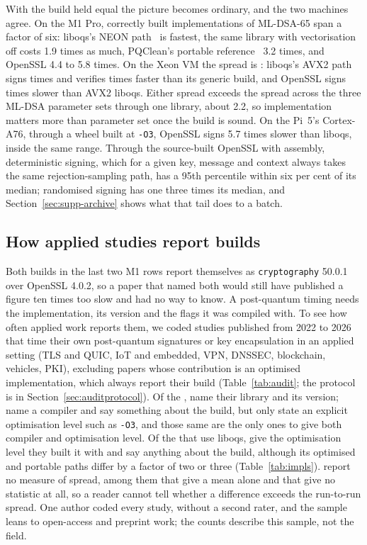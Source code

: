 With the build held equal the picture becomes ordinary, and the two machines
agree. On the M1 Pro, correctly built implementations of ML-DSA-65 span a
factor of six: liboqs's NEON path~\cite{becker2022neon} is fastest, the same
library with vectorisation off costs 1.9 times as much, PQClean's portable
reference~\cite{kannwischer2022pqclean} 3.2 times, and OpenSSL 4.4 to 5.8
times. On the Xeon VM the spread is \NxSpread: liboqs's AVX2 path signs
\NavxSign{} times and verifies \NavxVerify{} times faster than its generic
build, and OpenSSL signs \NxOsslVsOqs{} times slower than AVX2 liboqs. Either
spread exceeds the spread across the three ML-DSA parameter sets through one
library, about 2.2, so implementation matters more than parameter set once the
build is sound. On the Pi~5's Cortex-A76, through a wheel built at
\texttt{-O3}, OpenSSL signs 5.7 times slower than liboqs, inside the same
range. Through the source-built OpenSSL with assembly, deterministic signing, which for a given key, message and context always takes the same rejection-sampling path, has a 95th percentile within six per cent of its median; randomised signing has one
three times its median, and Section~\ref{sec:supp-archive} shows what that tail
does to a batch.

\subsection{How applied studies report builds}
\label{sec:audit}

Both builds in the last two M1 rows report themselves as
\texttt{cryptography} 50.0.1 over OpenSSL 4.0.2, so a paper that named both
would still have published a figure ten times too slow and had no way to know.
A post-quantum timing needs the implementation, its version and the flags it
was compiled with. To see how often applied work reports them, we coded \NauditN{} studies published from 2022 to 2026 that time their own post-quantum
signatures or key encapsulation in an applied setting (TLS and QUIC, IoT and
embedded, VPN, DNSSEC, blockchain, vehicles, PKI), excluding papers whose
contribution is an optimised implementation, which always report their build
(Table~\ref{tab:audit}; the protocol is in Section~\ref{sec:auditprotocol}). Of the \NauditN, \NauditLib{} name their library and \NauditVer{} its version; \NauditCc{} name a compiler and \NauditFlags{} say something about the build, but only \NauditOlevel{} state an explicit optimisation level such as \texttt{-O3}, and those same \NauditBoth{} are the only ones to give both compiler and optimisation level. Of the \NauditOqs{} that use liboqs, \NauditOqsBuild{} give the optimisation level they built it with and \NauditOqsAny{} say anything about the build, although its optimised and portable paths differ by a factor of two or three (Table~\ref{tab:impls}). \NauditNoSpread{} report no measure of spread, among them \NauditMeanNoSpread{} that give a mean alone and \NauditNoStat{} that give no statistic at all, so a reader cannot tell whether a difference exceeds the run-to-run spread. One author coded every study, without a second rater, and the sample leans to open-access and preprint work; the counts describe this sample, not the field.

